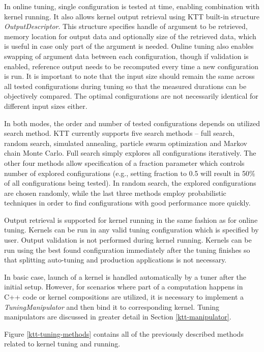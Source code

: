 \documentclass
[
    digital, %
    oneside, %
    table, %
    nolof, %
    nolot, %
    nocover %
]{fithesis3}
\begin{document}
In online tuning, single configuration is tested at time, enabling combination with kernel running. It also allows kernel output retrieval using
KTT built-in structure \textit{OutputDescriptor}. This structure specifies handle of argument to be retrieved, memory location for output data and
optionally size of the retrieved data, which is useful in case only part of the argument is needed. Online tuning also enables swapping of argument
data between each configuration, though if validation is enabled, reference output needs to be recomputed every time a new configuration is run.
It is important to note that the input size should remain the same across all tested configurations during tuning so that the measured durations
can be objectively compared. The optimal configurations are not necessarily identical for different input sizes either.

In both modes, the order and number of tested configurations depends on utilized search method. KTT currently supports five search methods -- full
search, random search, simulated annealing, particle swarm optimization and Markov chain Monte Carlo. Full search simply explores all configurations
iteratively. The other four methods allow specification of a fraction parameter which controls number of explored configurations (e.g., setting fraction
to 0.5 will result in 50\% of all configurations being tested). In random search, the explored configurations are chosen randomly, while the last three
methods employ probabilistic techniques in order to find configurations with good performance more quickly.

Output retrieval is supported for kernel running in the same fashion as for online tuning. Kernels can be run in any valid tuning configuration which is
specified by user. Output validation is not performed during kernel running. Kernels can be run using the best found configuration immediately after the
tuning finishes so that splitting auto-tuning and production applications is not necessary.

In basic case, launch of a kernel is handled automatically by a tuner after the initial setup. However, for scenarios where part of a computation
happens in C++ code or kernel compositions are utilized, it is necessary to implement a \textit{TuningManipulator} and then bind it to corresponding
kernel. Tuning manipulators are discussed in greater detail in Section \ref{ktt-manipulator}.

Figure \ref{ktt-tuning-methods} contains all of the previously described methods related to kernel tuning and running.
\end{document}
